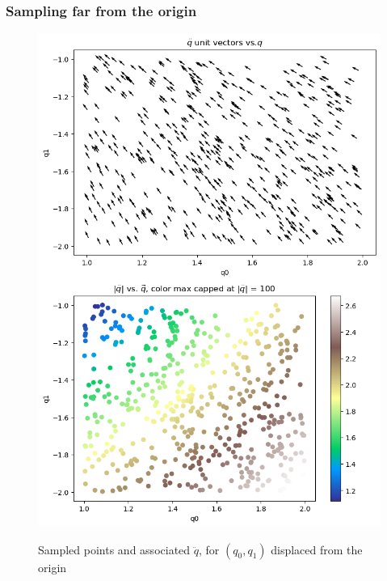 \documentclass[]{article}
\begin{document}
\begin{appendices}
\subsubsection{Sampling far from the origin}

\begin{figure}[H]
	\caption{Sampled points and associated $\ddot{q}$, for $(q_0,q_1)$ displaced from the origin}
	\centering
	\includegraphics[scale=0.40]{2D-sampling-farther-away.png}
	\label{fig:2D-sampling-father-away}
\end{figure}


\end{appendices}
\end{document}
